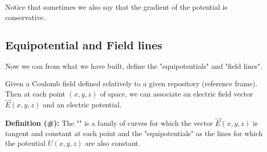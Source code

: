 	Notice that sometimes we also say that the gradient of the potential is conservative.

	\pagebreak
	\subsection{Equipotential and Field lines}
	Now we can from what we have built, define the "equipotentials" and "field lines".
	
	Given a Coulomb field defined relatively to a given repository (reference frame). Then at each point $(x, y, z)$ of space, we can associate an electric field vector $\vec{E}(x,y,z)$ and an electric potential.
	
	\textbf{Definition (\#\mydef):} The "" is a family of curves for which the vector $\vec{E}(x,y,z)$ is tangent and constant at each point and the "equipotentials" as the lines for which the potential $U (x, y, z)$ are also constant.
	
